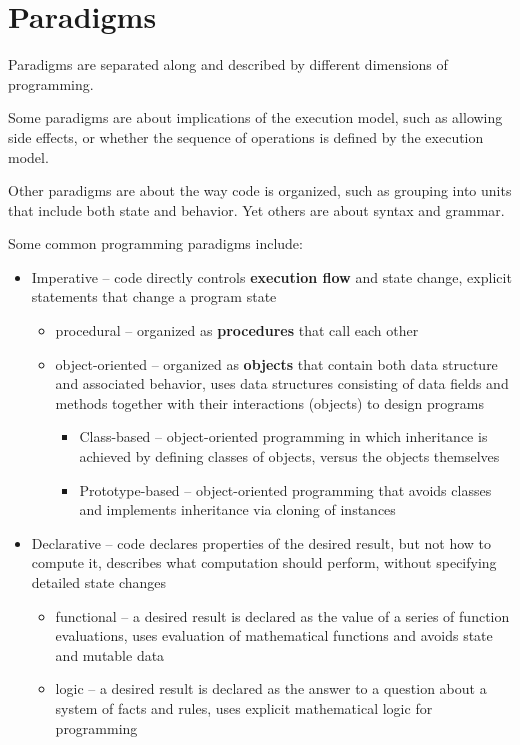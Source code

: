 \documentclass[tikz,border=10pt]{project_plan}
\begin{document}
\section{Paradigms}

Paradigms are separated along and described by different dimensions of programming.

Some paradigms are about implications of the execution model,
such as allowing side effects, or whether the sequence of operations is
defined by the execution model.

Other paradigms are about the way code is organized, such as grouping into
units that include both state and behavior. Yet others are about syntax
and grammar.

Some common programming paradigms include:
\begin{itemize}
  \item Imperative – code directly controls \textbf{execution flow} and state change, explicit statements that change a program state
        \begin{itemize}
          \item procedural – organized as \textbf{procedures} that call each other
          \item object-oriented – organized as \textbf{objects} that contain both data structure and associated behavior, uses data structures consisting of data fields and methods together with their interactions (objects) to design programs
                \begin{itemize}
                  \item Class-based – object-oriented programming in which inheritance is achieved by defining classes of objects, versus the objects themselves
                  \item Prototype-based – object-oriented programming that avoids classes and implements inheritance via cloning of instances
                \end{itemize}
        \end{itemize}
  \item Declarative – code declares properties of the desired result, but not how to compute it, describes what computation should perform, without specifying detailed state changes
        \begin{itemize}
          \item functional – a desired result is declared as the value of a series of function evaluations, uses evaluation of mathematical functions and avoids state and mutable data
          \item logic – a desired result is declared as the answer to a question about a system of facts and rules, uses explicit mathematical logic for programming

\end{itemize}
\end{itemize}
\end{document}
